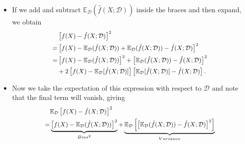 \documentclass[10pt,a4paper]{beamer}
\begin{document}
\begin{frame}{}



\begin{itemize}
  \item If we add and subtract $\mathbb{E}_{\mathcal{D}}(\hat{f}(X;\mathcal{D}))$ inside the braces and then expand, we obtain
  \begin{equation}\label{}\nonumber\small
\begin{aligned}
&\left[f(X) - \hat{f}(X;\mathcal{D})\right]^2\\
=& \left[f(X) - \mathbb{E}_{\mathcal{D}}(\hat{f}(X;\mathcal{D})) + \mathbb{E}_{\mathcal{D}}(\hat{f}(X;\mathcal{D})) - \hat{f}(X;\mathcal{D})\right]^2\\
=& \left[f(X) - \mathbb{E}_{\mathcal{D}}(\hat{f}(X;\mathcal{D}))\right]^2 + \left[\mathbb{E}_{\mathcal{D}}(\hat{f}(X;\mathcal{D})) - \hat{f}(X;\mathcal{D})\right]^2 \\
&+ 2\left[ f(X)- \mathbb{E}_{\mathcal{D}}[\hat{f}(X;\mathcal{D})] \right] \left[\mathbb{E}_{\mathcal{D}}[\hat{f}(X;\mathcal{D})] - \hat{f}(X;\mathcal{D})  \right] .
\end{aligned}
\end{equation}
  \item Now we take the expectation of this expression with respect to $\mathcal{D}$ and note that the final term will vanish, giving
    \begin{equation}\label{tradeoff}\nonumber\small
    \begin{aligned}
    &\mathbb{E}_{\mathcal{D}}\left[f(X) - \hat{f}(X;\mathcal{D})\right]^2\\
    =& \underbrace{\left[f(X) - \mathbb{E}_{\mathcal{D}}(\hat{f}(X;\mathcal{D}))\right]^2}_{Bias^2} + \underbrace{\mathbb{E}_{\mathcal{D}}\left[\left[\mathbb{E}_{\mathcal{D}}(\hat{f}(X;\mathcal{D})) - \hat{f}(X;\mathcal{D})\right]^2\right]}_{Variance}
    \end{aligned}
    \end{equation}
\end{itemize}

\end{frame}
\end{document}
